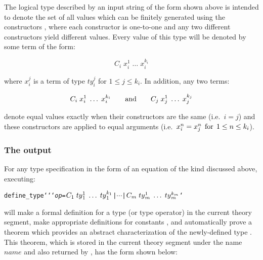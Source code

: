 {{The logical type described by an input string of the form
shown above is intended
to denote the set of all values which can be finitely 
generated using the constructors , 
where each constructor is one-to-one and any two
different constructors yield different values.   Every value of this 
type will be denoted by some term of the form:

\[ C_i\;x_i^1\;\ldots\;x_i^{k_i} \]

\noindent where $x_i^j$ is a term of type $ty_i^j$ for $1 \leq j \leq
k_i$. In addition, any two terms:

\[ C_i\;x_i^1\;\ldots\;x_i^{k_i} \qquad {\rm and} \qquad
   C_j\;x_j^1\;\ldots\;x_j^{k_j} \]

\noindent denote equal values exactly when their constructors are the same
(i.e.\ $i=j$) and these constructors are applied to equal arguments 
(i.e.\ $x_i^n = x_j^n\;\,{\rm for}\;\,1\leq n\leq k_i$).  

\subsubsection{The output}\label{define-type-output}

\noindent For any type specification 
in the form of an equation of the kind discussed above, executing:

{\def\op{{\normalsize\sl op}}
\begin{hol}
\begin{alltt}
   define\_type `` `{\op} = \(C\sb{1}\;ty{}\sb{1}\sp{1}\;\ldots\;ty{}\sb{1}\sp{k\sb{1}} \) | \(\cdots\) | \(C\sb{m}\;ty{}\sb{m}\sp{1}\;\ldots\;ty{}\sb{m}\sp{k\sb{m}}\)`
\end{alltt}\end{hol}}

\noindent will make a formal definition for a  
type (or  type operator) 
in the current theory segment, make appropriate definitions for
constants  ,
and automatically prove a theorem which
provides an abstract
characterization 
of the newly-defined type .  This theorem, which is
stored in the current theory segment under the name $name$ and also returned by
, has the form shown below:

}}
